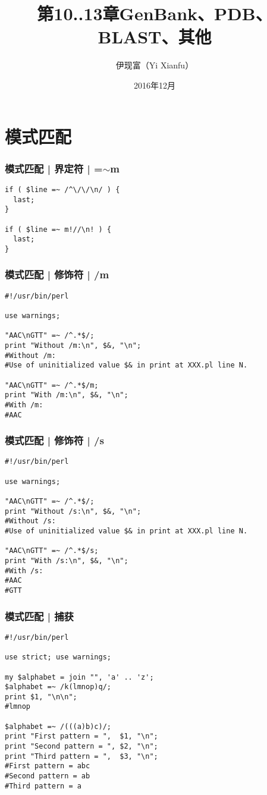 


\title[其他]{第10..13章\quad GenBank、PDB、BLAST、其他}
\author[Yixf]{伊现富（Yi Xianfu）}
\date{2016年12月}




\section{模式匹配}
\begin{frame}[fragile]
  \frametitle{模式匹配 | 界定符 | =$\sim$m}
\begin{lstlisting}
if ( $line =~ /^\/\/\n/ ) {
  last;
}

if ( $line =~ m!//\n! ) {
  last;
}
\end{lstlisting}
\end{frame}

\begin{frame}[fragile]
  \frametitle{模式匹配 | 修饰符 | /m}
\begin{lstlisting}
#!/usr/bin/perl

use warnings;

"AAC\nGTT" =~ /^.*$/;
print "Without /m:\n", $&, "\n";
#Without /m:
#Use of uninitialized value $& in print at XXX.pl line N.

"AAC\nGTT" =~ /^.*$/m;
print "With /m:\n", $&, "\n";
#With /m:
#AAC
\end{lstlisting}
\end{frame}

\begin{frame}[fragile]
  \frametitle{模式匹配 | 修饰符 | /s}
\begin{lstlisting}
#!/usr/bin/perl

use warnings;

"AAC\nGTT" =~ /^.*$/;
print "Without /s:\n", $&, "\n";
#Without /s:
#Use of uninitialized value $& in print at XXX.pl line N.

"AAC\nGTT" =~ /^.*$/s;
print "With /s:\n", $&, "\n";
#With /s:
#AAC
#GTT
\end{lstlisting}
\end{frame}

\begin{frame}[fragile]
  \frametitle{模式匹配 | 捕获}
\begin{lstlisting}
#!/usr/bin/perl

use strict; use warnings;

my $alphabet = join "", 'a' .. 'z';
$alphabet =~ /k(lmnop)q/;
print $1, "\n\n";
#lmnop

$alphabet =~ /(((a)b)c)/;
print "First pattern = ",  $1, "\n";
print "Second pattern = ", $2, "\n";
print "Third pattern = ",  $3, "\n";
#First pattern = abc
#Second pattern = ab
#Third pattern = a
\end{lstlisting}
\end{frame}

